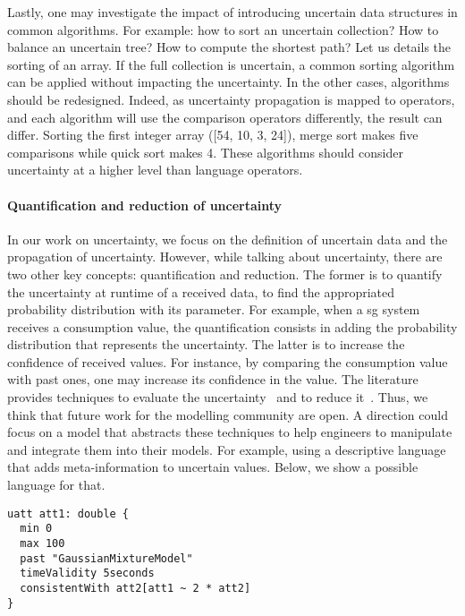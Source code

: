 Lastly, one may investigate the impact of introducing uncertain data structures in common algorithms.
For example: how to sort an uncertain collection? How to balance an uncertain tree? How to compute the shortest path?
Let us details the sorting of an array.
If the full collection is uncertain, a common sorting algorithm can be applied without impacting the uncertainty.
In the other cases, algorithms should be redesigned.
Indeed, as uncertainty propagation is mapped to operators, and each algorithm will use the comparison operators differently, the result can differ.
Sorting the first integer array ([54, 10, 3, 24]), merge sort makes five comparisons while quick sort makes 4. 
These algorithms should consider uncertainty at a higher level than language operators.

\paragraph{Quantification and reduction of uncertainty}
In our work on uncertainty, we focus on the definition of uncertain data and the propagation of uncertainty.
However, while talking about uncertainty, there are two other key concepts: quantification and reduction.
The former is to quantify the uncertainty at runtime of a received data, \eg to find the appropriated probability distribution with its parameter.
For example, when a \gls{sg} system receives a consumption value, the quantification consists in adding the probability distribution that represents the uncertainty.
The latter is to increase the confidence of received values.
For instance, by comparing the consumption value with past ones, one may increase its confidence in the value.
The literature provides techniques to evaluate the uncertainty~\cite{wubbeler2008evaluation, metrology2008evaluation} and to reduce it~\cite{shafer1992dempster}.
Thus, we think that future work for the modelling community are open.
A direction could focus on a \gls{model} that abstracts these techniques to help engineers to manipulate and integrate them into their models.
For example, using a descriptive language that adds meta-information to uncertain values.
Below, we show a possible language for that.

\begin{lstlisting}[style=pouetPouetStyle, caption=Example of a descriptive language to define meta-information uncertainty]
uatt att1: double {
  min 0
  max 100
  past "GaussianMixtureModel"
  timeValidity 5seconds
  consistentWith att2[att1 ~ 2 * att2]
}
\end{lstlisting}

